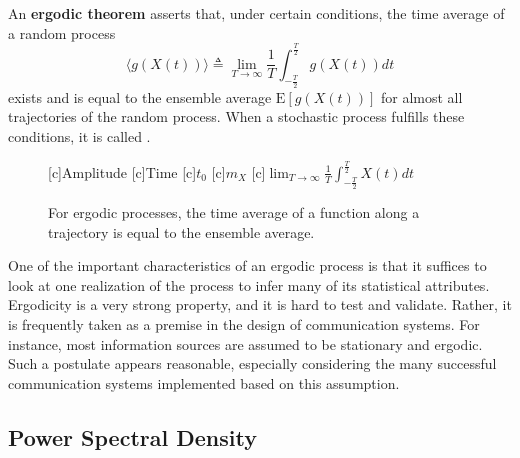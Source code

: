 \begin{definition}[Ergodic]
An \textbf{ergodic theorem} asserts that, under certain conditions, the time average of a random process
\begin{equation*}
\langle g(X(t)) \rangle \triangleq \lim_{T \rightarrow \infty} \frac{1}{T} \int_{- \frac{T}{2}}^{\frac{T}{2}} g(X(t)) dt
\end{equation*}
exists and is equal to the ensemble average $\mathrm{E}[g(X(t))]$ for almost all trajectories of the random process.
When a stochastic process fulfills these conditions, it is called .
\end{definition}

\begin{figure}[htbp]
\begin{center}
\begin{psfrags}
[c]{Amplitude}
[c]{Time}
[c]{$t_0$}
[c]{$m_X$}
[c]{$\lim_{T \rightarrow \infty} \frac{1}{T} \int_{- \frac{T}{2}}^{\frac{T}{2}} X(t) dt$}
\end{psfrags}
\caption{For ergodic processes, the time average of a function along a trajectory is equal to the ensemble average.}
\label{figure:ErgodicProcess}
\end{center}
\end{figure}

One of the important characteristics of an ergodic process is that it suffices to look at one realization of the process to infer many of its statistical attributes.
Ergodicity is a very strong property, and it is hard to test and validate.
Rather, it is frequently taken as a premise in the design of communication systems.
For instance, most information sources are assumed to be stationary and ergodic.
Such a postulate appears reasonable, especially considering the many successful communication systems implemented based on this assumption.


\subsection{Power Spectral Density}

